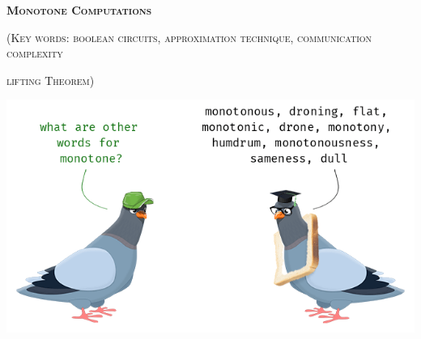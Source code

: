 


\thispagestyle{empty}

\centerline{\large \textsc{\textbf{Monotone Computations}}}
\centerline{\small \textsc{(Key words: boolean circuits, approximation technique, communication complexity}}
\centerline{\small \textsc{lifting Theorem)}}

\bigskip



\vspace{1cm}

\begin{center}
    \includegraphics[scale = 0.5]{pics/monotone.png}
\end{center}

\vspace{1cm}


\nocite{*}



